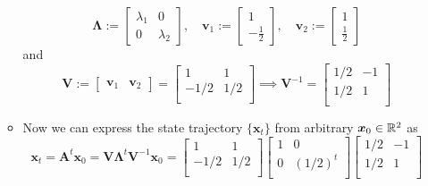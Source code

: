 \documentclass[12pt,a4paper]{article}
\begin{document}
\begin{itemize}
\begin{itemize}
\begin{equation}
      \bm{\Lambda}:=
      \begin{bmatrix}
       \lambda_{1} & 0\\
       0 & \lambda_{2}
      \end{bmatrix},
      \quad
      \bm{v}_{1} :=
      \begin{bmatrix}
        1 \\
        - \frac{1}{2}
      \end{bmatrix},
      \quad
      \bm{v}_{2} :=
      \begin{bmatrix}
        1 \\
        \frac{1}{2}
      \end{bmatrix}
    \end{equation}
    and
    \begin{equation}\nonumber%
      \bm{V}:=
      \begin{bmatrix}
        \bm{v}_{1} & \bm{v}_{2}
      \end{bmatrix}
      =
      \begin{bmatrix}
        1 & 1 \\
        -1/2 & 1/2 \\
      \end{bmatrix}
      \implies
      \bm{V}^{-1} =
      \begin{bmatrix}
        1/2 & -1 \\
        1/2 & 1 \\
      \end{bmatrix}
      \end{equation}
    \item Now we can express the state trajectory $\{\bm{x}_{t}\}$ from arbitrary $\bm{x}_{0}\in \mathbb{R}^{2}$ as
      \begin{equation}\nonumber%
        \bm{x}_{t} =
        \bm{A}^{t}\bm{x}_{0}
        =
        \bm{V}\bm{\Lambda}^{t}\bm{V}^{-1}\bm{x}_{0}
        =
      \begin{bmatrix}
        1 & 1 \\
        -1/2 & 1/2 \\
      \end{bmatrix}
      \begin{bmatrix}
        1 & 0 \\
        0 & (1/2)^{t} \\
      \end{bmatrix}
      \begin{bmatrix}
        1/2 & -1 \\
        1/2 & 1 \\

\end{bmatrix}
\end{equation}
\end{itemize}
\end{itemize}
\end{document}
